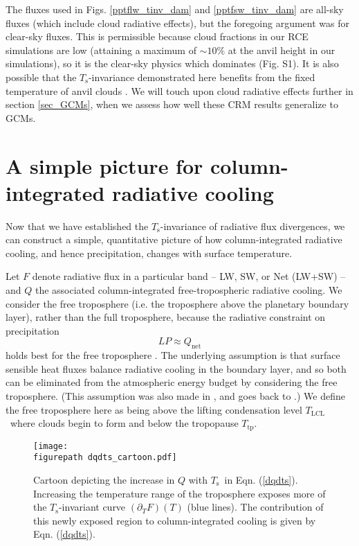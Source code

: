 \documentclass[9pt,twocolumn,twoside,lineno]{pnas-new}
\newcommand{\beqn}{\begin{equation}}
\newcommand{\eeqn}{\end{equation}}
\newcommand{\eqnref}[1]{(\ref{#1})}
\newcommand{\ppt}{\ensuremath{\partial_T}}
\newcommand{\Qnet}{\ensuremath{Q_\mathrm{net}}}
\newcommand{\Ts}{\ensuremath{T_\mathrm{s}}}
\newcommand{\Tlcl}{\ensuremath{T_\mathrm{LCL}}}
\newcommand{\Ttp}{\ensuremath{T_\mathrm{tp}}}
\newcommand{\figurepath}{../../figures/}
\begin{document}
The fluxes used in Figs.  \ref{pptflw_tinv_dam} and \ref{pptfsw_tinv_dam} are all-sky fluxes (which include cloud radiative effects), but the foregoing argument was for clear-sky fluxes. This is permissible because cloud fractions in our RCE simulations are low (attaining a maximum of $\sim 10 \%$ at the anvil height in our simulations), so it is the clear-sky physics which dominates (Fig. S1). It is also possible that the \Ts-invariance demonstrated here benefits from the fixed temperature of anvil clouds \cite{hartmann2002,kuang2007,harrop2012}. We will touch upon cloud radiative effects further in section \ref{sec_GCMs}, when we assess how well these CRM results generalize to GCMs.
 
		
\section{A simple picture for column-integrated radiative cooling} \label{sec_simple_Q}

Now that we have established  the \Ts-invariance of radiative flux divergences, we can construct a simple, quantitative picture of how column-integrated radiative cooling, and hence precipitation,  changes with surface temperature. 
	
	Let $F$ denote radiative flux in a particular band -- LW, SW, or Net (LW+SW) -- and $Q$ the associated column-integrated free-tropospheric radiative cooling. We consider  the free troposphere (i.e. the troposphere above the planetary boundary layer), rather than the full troposphere, because the radiative constraint on precipitation 
		\beqn
			LP \approx \Qnet
		\label{p_constraint}
		\eeqn
		 holds best for the free troposphere  \cite{ogorman2012}. The underlying assumption is that surface sensible heat fluxes balance radiative cooling in the boundary layer, and so both can be eliminated from the atmospheric energy budget by considering the free troposphere. (This assumption was also made in \cite{takahashi2009}, and goes back to \cite{betts1989}.) We define the free troposphere here as being above the lifting condensation level \Tlcl\ where clouds begin to form and below the tropopause \Ttp.
	
\begin{figure}[t]
	\begin{center}
			\texttt{[image: \\figurepath dqdts\_cartoon.pdf]}
		\caption{Cartoon depicting the increase in $Q$ with \Ts\ in Eqn. \eqnref{dqdts}. Increasing the temperature range of the troposphere  exposes more of the \Ts-invariant curve $(\ppt F)(T)$ (blue lines). The contribution  of this newly exposed region to column-integrated cooling is given by Eqn. \eqnref{dqdts}.
		\label{dqdts_cartoon}
		}
	\end{center}
\end{figure}
\end{document}
